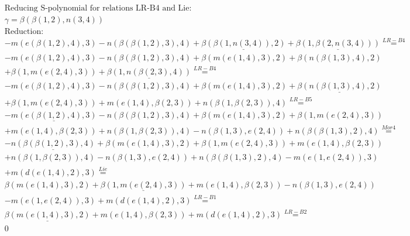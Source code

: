 \documentclass[11pt]{amsart}
\begin{document}
\begin{align*} 
& \text{Reducing S-polynomial for relations LR-B4 and Lie:} \\ 
& \gamma = \beta(\beta(1,2),n(3,4)) \\ 
& \text{Reduction}: \\& - m(e(\beta(1,2),4),3) - n(\beta(\beta(1,2),3),4) + \underline{\beta(\beta(1,n(3,4)),2)} + \underline{\beta(1,\beta(2,n(3,4)))} \stackrel{ LR-B4 }{=}  \\ 
& - m(e(\beta(1,2),4),3) - n(\beta(\beta(1,2),3),4) + \beta(m(e(1,4),3),2) + \beta(n(\beta(1,3),4),2)\\ 
 &  + \beta(1,m(e(2,4),3)) + \underline{\beta(1,n(\beta(2,3),4))} \stackrel{ LR-B4 }{=}  \\ 
& - m(e(\beta(1,2),4),3) - n(\beta(\beta(1,2),3),4) + \beta(m(e(1,4),3),2) + \underline{\beta(n(\beta(1,3),4),2)}\\ 
 &  + \beta(1,m(e(2,4),3)) + m(e(1,4),\beta(2,3)) + n(\beta(1,\beta(2,3)),4) \stackrel{ LR-B5 }{=}  \\ 
& - \underline{m(e(\beta(1,2),4),3)} - n(\beta(\beta(1,2),3),4) + \beta(m(e(1,4),3),2) + \beta(1,m(e(2,4),3))\\ 
 &  + m(e(1,4),\beta(2,3)) + n(\beta(1,\beta(2,3)),4) - n(\beta(1,3),e(2,4)) + n(\beta(\beta(1,3),2),4) \stackrel{ Mor4 }{=}  \\ 
& - \underline{n(\beta(\beta(1,2),3),4)} + \beta(m(e(1,4),3),2) + \beta(1,m(e(2,4),3)) + m(e(1,4),\beta(2,3))\\ 
 &  + n(\beta(1,\beta(2,3)),4) - n(\beta(1,3),e(2,4)) + n(\beta(\beta(1,3),2),4) - m(e(1,e(2,4)),3)\\ 
 &  + m(d(e(1,4),2),3) \stackrel{ Lie }{=}  \\ 
&\beta(m(e(1,4),3),2) + \underline{\beta(1,m(e(2,4),3))} + m(e(1,4),\beta(2,3)) - n(\beta(1,3),e(2,4))\\ 
 &  - m(e(1,e(2,4)),3) + m(d(e(1,4),2),3) \stackrel{ LR-B1 }{=}  \\ 
&\underline{\beta(m(e(1,4),3),2)} + m(e(1,4),\beta(2,3)) + m(d(e(1,4),2),3) \stackrel{ LR-B2 }{=}  \\ 
&0\\ 
\end{align*} 
 
\end{document}
